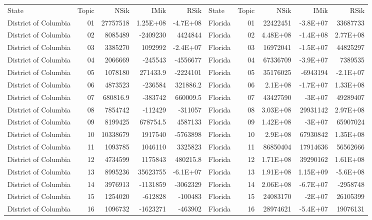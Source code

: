 \begin{table}[]
	\footnotesize
	\begin{tabular}{lrrrrlrrrr}
		State & Topic & NSik & IMik & RSik & State & Topic & NSik & IMik & RSik \\
		District of Columbia &  01  & 27757518 & 1.25E+08 & -4.7E+08 & Florida &  01  & 22422451 & -3.8E+07 & 33687733 \\
		District of Columbia &  02  & 8085489 & -2409230 & 4424844 & Florida &  02  & 4.48E+08 & -1.4E+08 & 2.77E+08 \\
		District of Columbia &  03  & 3385270 & 1092992 & -2.4E+07 & Florida &  03  & 16972041 & -1.5E+07 & 44825297 \\
		District of Columbia &  04  & 2066669 & -245543 & -4556677 & Florida &  04  & 67336709 & -3.9E+07 & 7389535 \\
		District of Columbia &  05  & 1078180 & 271433.9 & -2224101 & Florida &  05  & 35176025 & -6943194 & -2.1E+07 \\
		District of Columbia &  06  & 4873523 & -236584 & 321886.2 & Florida &  06  & 2.1E+08 & -1.7E+07 & 1.33E+08 \\
		District of Columbia &  07  & 680816.9 & -383742 & 660009.5 & Florida &  07  & 43427590 & -3E+07 & 49289407 \\
		District of Columbia &  08  & 7854742 & -112429 & -311057 & Florida &  08  & 3.03E+08 & 29931142 & 2.97E+08 \\
		District of Columbia &  09  & 8199425 & 678754.5 & 4587133 & Florida &  09  & 1.42E+08 & -3E+07 & 65907024 \\
		District of Columbia &  10 & 10338679 & 1917540 & -5763898 & Florida &  10 & 2.9E+08 & 67930842 & 1.35E+08 \\
		District of Columbia &  11 & 1093785 & 1046110 & 3325823 & Florida &  11 & 86850404 & 17914636 & 56562666 \\
		District of Columbia &  12 & 4734599 & 1175843 & 480215.8 & Florida &  12 & 1.71E+08 & 39290162 & 1.61E+08 \\
		District of Columbia &  13 & 8995236 & 35623755 & -6.1E+07 & Florida &  13 & 1.91E+08 & 1.15E+09 & -5.6E+08 \\
		District of Columbia &  14 & 3976913 & -1131859 & -3062329 & Florida &  14 & 2.06E+08 & -6.7E+07 & -2958748 \\
		District of Columbia &  15 & 1254020 & -612828 & -100483 & Florida &  15 & 24083170 & -2E+07 & 26105399 \\
		District of Columbia &  16 & 1096732 & -1623271 & -463902 & Florida &  16 & 28974621 & -5.4E+07 & 19076131 \\

\end{tabular}
\end{table}
